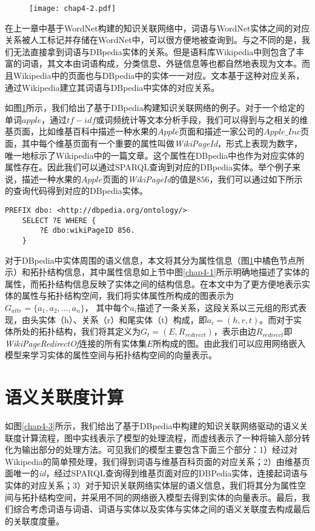 \begin{figure}[!ht]
    \centerline{\texttt{[image: chap4-2.pdf]}}
    \label{chap4-2}
\end{figure}

在上一章中基于WordNet构建的知识关联网络中，词语与WordNet实体之间的对应关系被人工标记并存储在WordNet中，可以很方便地被查询到。与之不同的是，我们无法直接拿到词语与DBpedia实体的关系。但是语料库Wikipedia中则包含了丰富的词语，其文本由词语构成，分类信息、外链信息等也都自然地表现为文本。而且Wikipedia中的页面也与DBpedia中的实体一一对应。文本基于这种对应关系，通过Wikipedia建立其词语与DBpedia中实体的对应关系。

如图\ref{chap4-2}所示，我们给出了基于DBpedia构建知识关联网络的例子。对于一个给定的单词$apple$，通过$tf-idf$或词频统计等文本分析手段，我们可以得到与之相关的维基页面，比如维基百科中描述一种水果的$Apple$页面和描述一家公司的$Apple\_Inc$页面，其中每个维基页面有一个重要的属性叫做\emph{WikiPageId}，形式上表现为数字，唯一地标示了Wikipedia中的一篇文章。这个属性在DBpedia中也作为对应实体的属性存在。因此我们可以通过SPARQL查询到对应的DBpedia实体。举个例子来说，描述一种水果的$Apple$页面的\emph{WikiPageId}的值是$856$，我们可以通过如下所示的查询代码得到对应的DBpedia实体。

\begin{lstlisting}[basicstyle=\fontsize{10}{11}\ttfamily,aboveskip=1em,frame=shadowbox]
    PREFIX dbo: <http://dbpedia.org/ontology/>
    SELECT ?E WHERE {
        ?E dbo:wikiPageID 856.
    }
\end{lstlisting}

对于DBpedia中实体周围的语义信息，本文将其分为属性信息（图\ref{chap4-2}中橘色节点所示）和拓扑结构信息，其中属性信息如上节中图\ref{chap4-1}所示明确地描述了实体的属性，而拓扑结构信息反映了实体之间的结构信息。在本文中为了更方便地表示实体的属性与拓扑结构空间，我们将实体属性所构成的图表示为$G_{attr} = \{a_1, a_2, ..., a_n\}$， 其中每个$a_i$描述了一条关系，这段关系以三元组的形式表现，由头实体（h）、关系（r）和尾实体（t）构成，即$a_i = (h, r, t)$。而对于实体所处的拓扑结构，我们将其定义为$G_{t} = (E, R_{redirect})$，表示由边$R_{redirect}$即\emph{WikiPageRedirectOf}连接的所有实体集$E$所构成的图。由此我们可以应用网络嵌入模型来学习实体的属性空间与拓扑结构空间的向量表示。

\section{语义关联度计算}
如图\ref{chap4-3}所示，我们给出了基于DBpedia中构建的知识关联网络驱动的语义关联度计算流程，图中实线表示了模型的处理流程，而虚线表示了一种将输入部分转化为输出部分的处理方法。可见我们的模型主要包含下面三个部分：1）经过对Wikipedia的简单预处理，我们得到词语与维基百科页面的对应关系；2）由维基页面唯一的\emph{id}，经过SPARQL查询得到维基页面对应的DBPedia实体，连接起词语与实体的对应关系；3）对于知识关联网络实体层的语义信息，我们将其分为属性空间与拓扑结构空间，并采用不同的网络嵌入模型去得到实体的向量表示。最后，我们综合考虑词语与词语、词语与实体以及实体与实体之间的语义关联度去构成最后的关联度度量。

